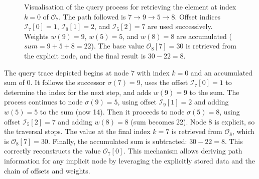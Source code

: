 \begin{figure}[htbp]
    \caption{Visualisation of the query process for retrieving the element at index $k=0$ of $\mathcal{O}_7$. The path followed is $7 \to 9 \to 5 \to 8$. Offset indices $\mathcal{I}_7[0]=1$, $\mathcal{I}_9[1]=2$, and $\mathcal{I}_5[2]=7$ are used successively. Weights $w(9)=9$, $w(5)=5$, and $w(8)=8$ are accumulated ($sum = 9+5+8=22$). The base value $\mathcal{O}_8[7]=30$ is retrieved from the explicit node, and the final result is $30 - 22 = 8$.}
    \label{fig:query_path_node7} %
\end{figure}

The query trace depicted begins at node 7 with index $k=0$ and an accumulated sum of 0. It follows the successor $\sigma(7)=9$, uses the offset $\mathcal{I}_7[0]=1$ to determine the index for the next step, and adds $w(9)=9$ to the sum. The process continues to node $\sigma(9)=5$, using offset $\mathcal{I}_9[1]=2$ and adding $w(5)=5$ to the sum (now 14). Then it proceeds to node $\sigma(5)=8$, using offset $\mathcal{I}_5[2]=7$ and adding $w(8)=8$ (sum becomes 22). Node 8 is explicit, so the traversal stops. The value at the final index $k=7$ is retrieved from $\mathcal{O}_8$, which is $\mathcal{O}_8[7]=30$. Finally, the accumulated sum is subtracted: $30 - 22 = 8$. This correctly reconstructs the value $\mathcal{O}_7[0]$. This mechanism allows deriving path information for any implicit node by leveraging the explicitly stored data and the chain of offsets and weights.


